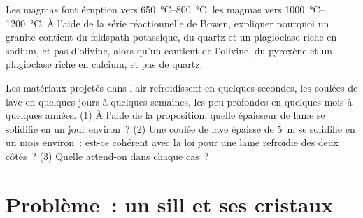 \begin{exercise}[$\star\star\star$]\label{exo:g11:igneous-rocks:14}
Les magmas  font éruption vers
\qtyrange{650}{800}{\degreeCelsius}, les magmas  vers
\qtyrange{1000}{1200}{\degreeCelsius}. À l'aide de la série réactionnelle
de Bowen, expliquer pourquoi un granite contient du feldspath potassique,
du quartz et un plagioclase riche en sodium, et pas d'olivine, alors qu'un
 contient de l'olivine, du pyroxène et un plagioclase riche en
calcium, et pas de quartz.
\end{exercise}

\begin{exercise}[$\star\star\star$]\label{exo:g11:igneous-rocks:15}
Les matériaux projetés dans l'air refroidissent en quelques secondes, les
coulées de lave en quelques jours à quelques semaines, les  peu
profondes en quelques mois à quelques années. (1) À l'aide de la
proposition, quelle épaisseur de lame se solidifie en un jour environ~?
(2) Une coulée de lave épaisse de \qty{5}{m} se solidifie en un mois
environ~: est-ce cohérent avec la loi pour une lame refroidie des deux
côtés~? (3) Quelle  attend-on dans chaque cas~?
\end{exercise}

\section{Problème~: un sill et ses cristaux}

